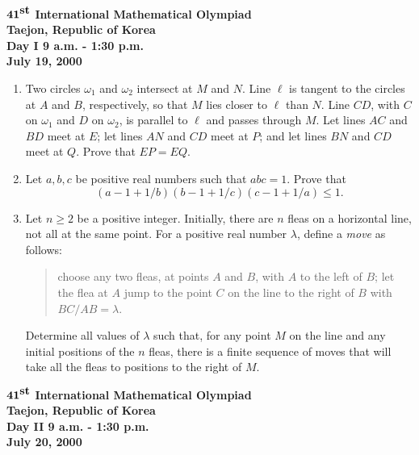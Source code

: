 \documentclass[12pt]{article}
\begin{document}
\begin{center}
${\bf 41}^{\mbox{\bf st}}$ {\bf International
Mathematical Olympiad} \\[.1in]
{\bf Taejon, Republic of Korea} \\ [.05in]
{\bf Day I \hspace{.25in} 9 a.m. - 1:30 p.m.}\\[.05in]
{\bf July 19, 2000}
\end{center}

\vspace*{.3in}

\begin{enumerate}
\item %
Two circles $\omega_1$ and $\omega_2$ intersect at $M$ and $N$. Line $\ell$
is tangent to the circles at $A$ and $B$, respectively, so that $M$ lies
closer to $\ell$ than $N$. Line $CD$, with $C$ on $\omega_1$ and $D$ on 
$\omega_2$, is parallel to $\ell$ and passes through $M$. Let lines
$AC$ and $BD$ meet at $E$; let lines $AN$ and $CD$ meet at $P$; and let lines
$BN$ and $CD$ meet at $Q$. Prove that $EP = EQ$.

\item %
Let $a,b,c$ be positive real numbers such that $abc=1$. Prove that
\[
(a-1+1/b)(b-1+1/c)(c-1+1/a) \leq 1.
\]

\item %
Let $n \geq 2$ be a positive integer. Initially, there are $n$ fleas on a
horizontal line, not all at the same point. For a positive real number
$\lambda$, define a \emph{move} as follows:
\begin{verse}
\noindent
  choose any two fleas, at points $A$ and $B$, with $A$ to the left of $B$;
let the flea at $A$ jump to the point $C$ on the line to the right of $B$
with $BC/AB = \lambda$.
\end{verse}
Determine all values of $\lambda$ such that, for any point $M$ on the line
and any initial positions of the $n$ fleas, there is a finite sequence of moves
that will take all the fleas to positions to the right of $M$.
\end{enumerate}

\pagebreak %
\begin{center}
${\bf 41}^{\mbox{\bf st}}$ {\bf International
Mathematical Olympiad} \\[.1in]
{\bf Taejon, Republic of Korea} \\ [.05in]
{\bf Day II \hspace{.25in} 9 a.m. - 1:30 p.m.}\\[.05in]
{\bf July 20, 2000}
\end{center}
\end{document}
